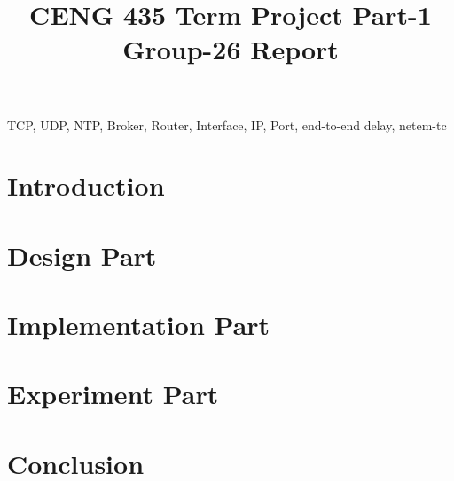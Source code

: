 \documentclass[conference]{IEEEtran}
\begin{document}

\title{CENG 435 Term Project Part-1 Group-26 Report}


\author
{
\and
{}
}
\maketitle



\begin{abstract}
\label{abstract}


\end{abstract}

\begin {keywords}
TCP, UDP, NTP, Broker, Router, Interface, IP, Port, end-to-end delay, netem-tc
\end{keywords}

\section{Introduction}
\label{intro}


\section{Design Part}
\label{section2}


\section{Implementation Part}
\label{section3}



\section{Experiment Part}
\label{section4}

	
\section{Conclusion}
\label {conclusion}






\end{document}
